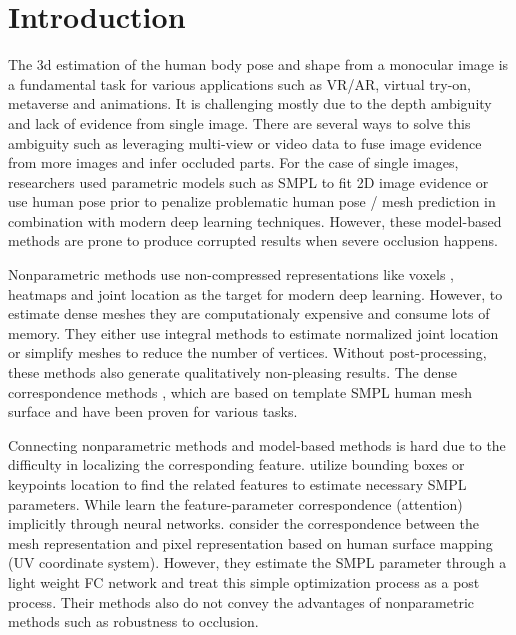 \documentclass[10pt,twocolumn,letterpaper]{article}
\begin{document}
\section{Introduction}



The 3d estimation of the human body pose and shape from a monocular image is a fundamental task for various applications such as VR/AR, virtual try-on, metaverse and animations. It is challenging mostly due to the depth ambiguity and lack of evidence from single image.  There are several ways to solve this ambiguity such as leveraging multi-view or video data to fuse image evidence from more images and infer occluded parts. For the case of single images, researchers used parametric models such as SMPL \cite{smpl} to fit 2D image evidence \cite{spin} or use human pose prior \cite{HMR,SMPL-X:2019,kocabas2019vibe} to penalize problematic human pose / mesh prediction in combination with modern deep learning techniques. However, these model-based methods are prone to produce corrupted results when severe occlusion happens. 

Nonparametric methods use non-compressed representations like voxels \cite{volumetric}, heatmaps \cite{I2L} and joint location \cite{integral,Meshtransformer,meshgraphormer} as the target for modern deep learning. However, to estimate dense meshes they are computationaly expensive and consume lots of memory. They either use integral methods to estimate normalized joint location \cite{I2L} or simplify meshes \cite{meshgraphormer} to reduce the number of vertices. Without post-processing, these methods also generate qualitatively non-pleasing results. The dense correspondence methods \cite{cvprooh,decomr,pamigcndensepose}, which are based on template SMPL human mesh surface and have been proven for various tasks. 

Connecting nonparametric methods and model-based methods is hard due to the difficulty in localizing the corresponding feature. \cite{holopose,spatialarrangements,I2L} utilize bounding boxes or keypoints location to find the related features to estimate necessary SMPL parameters. While \cite{pare,Meshtransformer} learn the feature-parameter correspondence (attention) implicitly through neural networks. \cite{decomr,pymaf} consider the correspondence between the mesh representation and pixel representation based on human surface mapping (UV coordinate system). However, they estimate the SMPL parameter through a light weight FC network and treat this simple optimization process as a post process. Their methods also do not convey the advantages of nonparametric methods such as robustness to occlusion.
\end{document}
